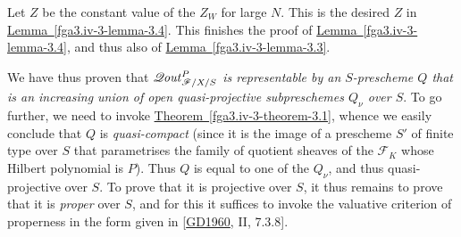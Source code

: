  Let \(Z\) be the constant value of the \(Z_W\) for large \(N\).
  This is the desired \(Z\) in \hyperref[fga3.iv-3-lemma-3.4]{Lemma~\ref*{fga3.iv-3-lemma-3.4}}.
  This finishes the proof of \hyperref[fga3.iv-3-lemma-3.4]{Lemma~\ref*{fga3.iv-3-lemma-3.4}}, and thus also of \hyperref[fga3.iv-3-lemma-3.3]{Lemma~\ref*{fga3.iv-3-lemma-3.3}}.\par{}We have thus proven that \emph{\(\mathscr {Q}\kern  -.75pt\mathit {out}_{{\mathscr {F}/X/S}}^P\) is representable by an \(S\)-prescheme \(Q\) that is an increasing union of open quasi-projective subpreschemes \(Q_\nu \) over \(S\)}.
  To go further, we need to invoke \hyperref[fga3.iv-3-theorem-3.1]{Theorem~\ref*{fga3.iv-3-theorem-3.1}}, whence we easily conclude that \(Q\) is \emph{quasi-compact} (since it is the image of a prescheme \(S'\) of finite type over \(S\) that parametrises the family of quotient sheaves of the \(\mathscr {F}_K\) whose Hilbert polynomial is \(P\)).
  Thus \(Q\) is equal to one of the \(Q_\nu \), and thus quasi-projective over \(S\).
  To prove that it is projective over \(S\), it thus remains to prove that it is \emph{proper} over \(S\), and for this it suffices to invoke the valuative criterion of properness in the form given in [\hyperref[GD1960]{GD1960}, II, 7.3.8].
